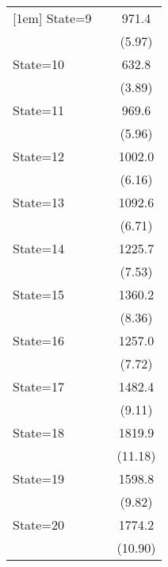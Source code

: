 {\begin{longtable}{l*{2}{c}}
[1em]
State=9             &                     &       971.4\sym{***}\\
                    &                     &      (5.97)         \\
[1em]
State=10            &                     &       632.8\sym{***}\\
                    &                     &      (3.89)         \\
[1em]
State=11            &                     &       969.6\sym{***}\\
                    &                     &      (5.96)         \\
[1em]
State=12            &                     &      1002.0\sym{***}\\
                    &                     &      (6.16)         \\
[1em]
State=13            &                     &      1092.6\sym{***}\\
                    &                     &      (6.71)         \\
[1em]
State=14            &                     &      1225.7\sym{***}\\
                    &                     &      (7.53)         \\
[1em]
State=15            &                     &      1360.2\sym{***}\\
                    &                     &      (8.36)         \\
[1em]
State=16            &                     &      1257.0\sym{***}\\
                    &                     &      (7.72)         \\
[1em]
State=17            &                     &      1482.4\sym{***}\\
                    &                     &      (9.11)         \\
[1em]
State=18            &                     &      1819.9\sym{***}\\
                    &                     &     (11.18)         \\
[1em]
State=19            &                     &      1598.8\sym{***}\\
                    &                     &      (9.82)         \\
[1em]
State=20            &                     &      1774.2\sym{***}\\
                    &                     &     (10.90)         \\

\end{longtable}}
